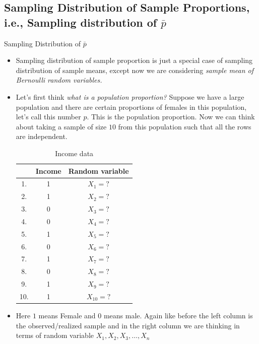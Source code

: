 \documentclass[8pt, usepdftitle=false]{beamer}
\begin{document}
\subsection{Sampling Distribution of Sample Proportions, i.e., Sampling distribution of $\bar{p}$}
\frame{\subsectionpage}

\begin{frame}[allowframebreaks]{Sampling Distribution of $\bar{p}$}
  
  \begin{itemize}
  \item Sampling distribution of sample proportion is just a special case of sampling distribution of sample means, except now we are considering \emph{sample mean of Bernoulli random variables.} 

  \item Let's first think \emph{what is a population proportion?} Suppose we have a large population and there are certain proportions of females in this population, let's call this number $p$. This is the population proportion. Now we can think about taking a sample of size $10$ from this population such that all the rows are independent. 

        \begin{table}[H]
      \begin{tabular}{|c|c|c|}
      \hline & Income & Random variable \\
      \hline 1. & 1 & $X_1=?$ \\
      \hline 2. & 1 & $X_2=?$ \\
      \hline 3. & 0 & $X_3=?$ \\
      \hline 4. & 0 & $X_4=?$ \\
      \hline 5. & 1 & $X_5=?$ \\
      \hline 6. & 0 & $X_6=?$ \\
      \hline 7. & 1 & $X_7=?$ \\
      \hline 8. & 0 & $X_8=?$ \\
      \hline 9. & 1 & $X_9=?$ \\
      \hline 10. & 1 & $X_{10}=?$ \\
      \hline
      \end{tabular}
      \caption{Income data}
      \end{table}

    \item Here $1$ means Female and $0$ means male. Again like before the left column is the observed/realized sample and in the right column we are thinking in terms of random variable $X_1, X_2, X_3, \ldots, X_n$


\end{itemize}
\end{frame}
\end{document}
